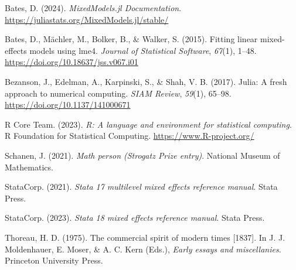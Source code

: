 \documentclass[
  letterpaper,
  DIV=11,
  numbers=noendperiod]{scrreprt}
\newlength{\cslhangindent}
\newenvironment{CSLReferences}[2] %
 {\begin{list}{}{%
  \setlength{\itemindent}{0pt}
  \setlength{\leftmargin}{0pt}
  \setlength{\parsep}{0pt}
  \ifodd #1
   \setlength{\leftmargin}{\cslhangindent}
   \setlength{\itemindent}{-1\cslhangindent}
  \fi
  \setlength{\itemsep}{#2\baselineskip}}}
 {\end{list}}
\begin{document}

\label{refs}
\begin{CSLReferences}{1}{0}
Bates, D. (2024). \emph{{MixedModels.jl Documentation}}.
\url{https://juliastats.org/MixedModels.jl/stable/}

Bates, D., Mächler, M., Bolker, B., \& Walker, S. (2015). Fitting linear
mixed-effects models using lme4. \emph{Journal of Statistical Software},
\emph{67}(1), 1--48. \url{https://doi.org/10.18637/jss.v067.i01}

Bezanson, J., Edelman, A., Karpinski, S., \& Shah, V. B. (2017). Julia:
A fresh approach to numerical computing. \emph{SIAM Review},
\emph{59}(1), 65--98. \url{https://doi.org/10.1137/141000671}

R Core Team. (2023). \emph{R: A language and environment for statistical
computing}. R Foundation for Statistical Computing.
\url{https://www.R-project.org/}

Schanen, J. (2021). \emph{Math person ({Strogatz Prize} entry)}.
National Museum of Mathematics.

StataCorp. (2021). \emph{Stata 17 multilevel mixed effects reference
manual}. Stata Press.

StataCorp. (2023). \emph{Stata 18 mixed effects reference manual}. Stata
Press.

Thoreau, H. D. (1975). The commercial spirit of modern times {[}1837{]}.
In J. J. Moldenhauer, E. Moser, \& A. C. Kern (Eds.), \emph{Early essays
and miscellanies}. Princeton University Press.

\end{CSLReferences}
\end{document}

